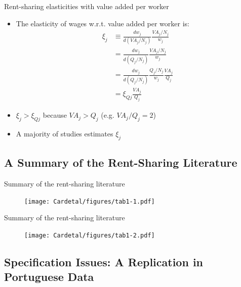 \documentclass[notes=show]{beamer}
\begin{document}
\begin{frame}{Rent-sharing elasticities with value added per worker}
\begin{itemize}
\item The elasticity of wages w.r.t. value added per worker is:
\begin{align*}
    \xi_{j} & \equiv \frac{d w_{j}}{d (VA_{j}/N_{j})} \frac{VA_{j}/N_{j}}{w_{j}} \nonumber \\
    & = \frac{d w_{j}}{d (Q_{j}/N_{j})} \frac{VA_{j}/N_{j}}{w_{j}} \nonumber \\
    & = \frac{d w_{j}}{d (Q_{j}/N_{j})} \frac{Q_{j}/N_{j}}{w_{j}} \frac{VA_{j}}{Q_{j}} \nonumber \\
    & = \xi_{Q{j}} \frac{VA_{j}}{Q_{j}} \nonumber
\end{align*}
\item $\xi_{j} >  \xi_{Q{j}} $ because $ VA_{j} > Q_{j}$ (e.g. $ VA_{j} / Q_{j} = 2$) \medskip 
\item A majority of studies estimates $\xi_{j} $
\end{itemize}
\end{frame}

\subsection*{A Summary of the Rent-Sharing Literature}

\newpage
\begin{frame}{Summary of the rent-sharing literature}
\begin{center}
\begin{figure}
\texttt{[image: Cardetal/figures/tab1-1.pdf]}
\end{figure} 
\end{center}
\end{frame}

\newpage
\begin{frame}{Summary of the rent-sharing literature}
\begin{center}
\begin{figure}
\texttt{[image: Cardetal/figures/tab1-2.pdf]}
\end{figure} 
\end{center}
\end{frame}

\subsection*{Specification Issues: A Replication in Portuguese Data}
\end{document}
